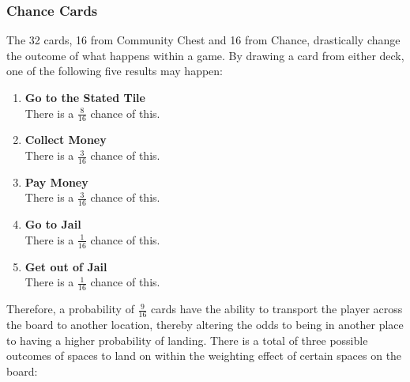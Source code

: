\documentclass[12pt]{article}
\begin{document}
\subsubsection{Chance Cards}
\label{Chance Card Probabilities}
The 32 cards, 16 from Community Chest and 16 from Chance, drastically change the outcome of what happens within a game. By drawing a card from either deck, one of the following five results may happen:
\begin{enumerate}
  \item \textbf{Go to the Stated Tile} \hfill\\
  There is a $\frac{8}{16}$ chance of this.
  \item \textbf{Collect Money} \hfill\\
  There is a $\frac{3}{16}$ chance of this.
  \item \textbf{Pay Money} \hfill\\
  There is a $\frac{3}{16}$ chance of this.
  \item \textbf{Go to Jail} \hfill\\
  There is a $\frac{1}{16}$ chance of this.
  \item \textbf{Get out of Jail} \hfill\\
  There is a $\frac{1}{16}$ chance of this.
\end{enumerate}
Therefore, a probability of $\frac{9}{16}$ cards have the ability to transport the player across the board to another location, thereby altering the odds to being in another place to having a higher probability of landing. There is a total of three possible outcomes of spaces to land on within the weighting effect of certain spaces on the board:
\end{document}
